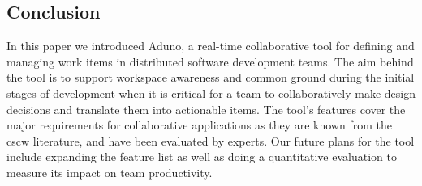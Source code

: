 \documentclass[conference]{IEEEtran}
\begin{document}
\subsection{Conclusion}
In this paper we introduced Aduno, a real-time collaborative tool for defining and managing work items in distributed software development teams. The aim behind the tool is to support workspace awareness and common ground during the initial stages of development when it is critical for a team to collaboratively make design decisions and translate them into actionable items. The tool's features cover the major requirements for collaborative applications as they are known from the {\sc cscw} literature, and have been evaluated by experts. Our future plans for the tool include expanding the feature list as well as doing a quantitative evaluation to measure its impact on team productivity.

 

\end{document}

